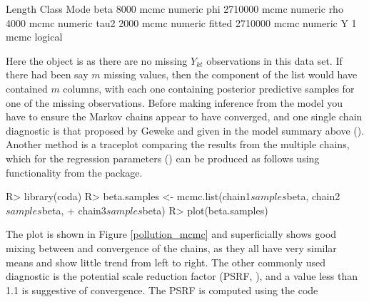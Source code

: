 \documentclass[article, nojss]{jss}
\begin{document}




\begin{CodeOutput}
       Length  Class Mode   
beta      8000 mcmc  numeric
phi    2710000 mcmc  numeric
rho       4000 mcmc  numeric
tau2      2000 mcmc  numeric
fitted 2710000 mcmc  numeric
Y            1 mcmc  logical
\end{CodeOutput}



Here the  object is  as there are no missing $Y_{kt}$ observations in this data set. If there had been say $m$ missing values, then the  component of the list would have contained $m$ columns, with each one containing posterior predictive samples for one of the missing observations. Before making inference from the model you have to ensure the Markov chains appear to have converged, and one single chain diagnostic is that proposed by Geweke and given in the model summary above (). Another method is a traceplot comparing the results from the multiple chains, which for the regression parameters () can be produced as follows using functionality from the  package.

\begin{CodeInput}
R>  library(coda)
R>  beta.samples <- mcmc.list(chain1$samples$beta, chain2$samples$beta, 
+           chain3$samples$beta)
R>  plot(beta.samples)
\end{CodeInput}

The plot is shown in Figure \ref{pollution_mcmc} and superficially shows good mixing between and convergence of the chains, as they all have very similar means and show little trend from left to right. The other commonly used diagnostic is the potential scale reduction factor (PSRF, \cite{gelman2013}), and a value less than 1.1 is suggestive of convergence. The PSRF is computed using the code
\end{document}
